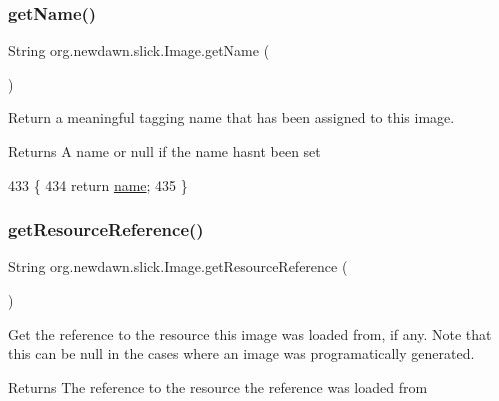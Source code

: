 \subsubsection{\texorpdfstring{get\+Name()}{getName()}}
{\footnotesize\ttfamily String org.\+newdawn.\+slick.\+Image.\+get\+Name (\begin{DoxyParamCaption}{ }\end{DoxyParamCaption})\hspace{0.3cm}{\ttfamily [inline]}}

Return a meaningful tagging name that has been assigned to this image.

\begin{DoxyReturn}{Returns}
A name or null if the name hasn\textquotesingle{}t been set 
\end{DoxyReturn}

\begin{DoxyCode}
433                             \{
434         \textcolor{keywordflow}{return} \mbox{\hyperlink{classorg_1_1newdawn_1_1slick_1_1_image_a6965c875dc3a3106ccbcc7a6b308c240}{name}};
435     \}
\end{DoxyCode}
\mbox{\label{classorg_1_1newdawn_1_1slick_1_1_image_a2c02f07811aaf4a90bddc89d37e60ff8}} 
\subsubsection{\texorpdfstring{get\+Resource\+Reference()}{getResourceReference()}}
{\footnotesize\ttfamily String org.\+newdawn.\+slick.\+Image.\+get\+Resource\+Reference (\begin{DoxyParamCaption}{ }\end{DoxyParamCaption})\hspace{0.3cm}{\ttfamily [inline]}}

Get the reference to the resource this image was loaded from, if any. Note that this can be null in the cases where an image was programatically generated.

\begin{DoxyReturn}{Returns}
The reference to the resource the reference was loaded from 
\end{DoxyReturn}

